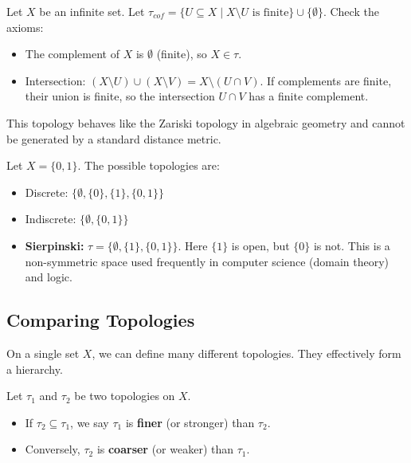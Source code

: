 \documentclass[oneside]{book}
\begin{document}
\newpage

\begin{example}
Let $X$ be an infinite set. Let $\tau_{cof} = \{ U \subseteq X \mid X \setminus U \text{ is finite} \} \cup \{ \emptyset \}$.
Check the axioms:
\begin{itemize}
    \item The complement of $X$ is $\emptyset$ (finite), so $X \in \tau$.
    \item Intersection: $(X \setminus U) \cup (X \setminus V) = X \setminus (U \cap V)$. If complements are finite, their union is finite, so the intersection $U \cap V$ has a finite complement.
\end{itemize}
This topology behaves like the Zariski topology in algebraic geometry and cannot be generated by a standard distance metric.
\end{example}

\begin{example}
Let $X = \{0, 1\}$. The possible topologies are:
\begin{itemize}
    \item Discrete: $\{\emptyset, \{0\}, \{1\}, \{0,1\}\}$
    \item Indiscrete: $\{\emptyset, \{0,1\}\}$
    \item \textbf{Sierpinski:} $\tau = \{\emptyset, \{1\}, \{0,1\}\}$. Here $\{1\}$ is open, but $\{0\}$ is not. This is a non-symmetric space used frequently in computer science (domain theory) and logic.
\end{itemize}
\end{example}

\subsection{Comparing Topologies}

On a single set $X$, we can define many different topologies. They effectively form a hierarchy.

\begin{definition}
Let $\tau_1$ and $\tau_2$ be two topologies on $X$.
\begin{itemize}
    \item If $\tau_2 \subseteq \tau_1$, we say $\tau_1$ is \textbf{finer} (or stronger) than $\tau_2$.
    \item Conversely, $\tau_2$ is \textbf{coarser} (or weaker) than $\tau_1$.
\end{itemize}
\end{definition}
\end{document}
